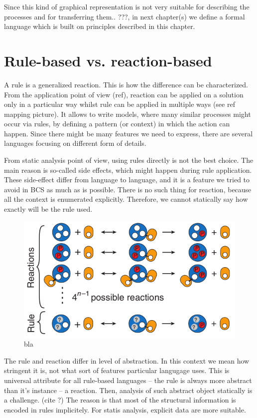 \documentclass[12pt]{fithesis2}
\begin{document}
Since this kind of graphical representation is not very suitable for describing the processes and for transferring them.. ???, in next chapter(s) we define a formal language which is built on principles described in this chapter.

\section{Rule-based vs. reaction-based}

A rule is a generalized reaction. This is how the difference can be characterized. From the application point of view (ref), reaction can be applied on a solution only in a particular way whilst rule can be applied in multiple ways (see ref mapping picture). It allows to write models, where many similar processes might occur via rules, by defining a pattern (or context) in which the action can happen. Since there might be many features we need to express, there are several languages focusing on different form of details.  

From static analysis point of view, using rules directly is not the best choice. The main reason is so-called side effects, which might happen during rule application. These side-effect differ from language to language, and it is a feature we tried to avoid in BCS as much as is possible. There is no such thing for reaction, because all the context is enumerated explicitly. Therefore, we cannot statically say how exactly will be the rule used.

\begin{figure}
\begin{center}
\includegraphics[scale=0.5]{pics/reaction_vs_rule}
\end{center}
\caption{bla}
\end{figure}

The rule and reaction differ in level of abstraction. In this context we mean how stringent it is, not what sort of features particular langugage uses. This is universal attribute for all rule-based languages -- the rule is always more abstract than it's instance -- a reaction. Then, analysis of such abstract object statically is a challenge. (cite ?) The reason is that most of the structural information is encoded in rules implicitely. For statis analysis, explicit data are more suitable.
\end{document}
